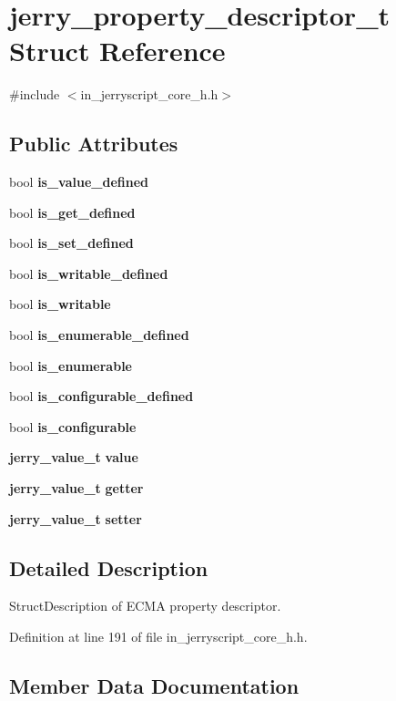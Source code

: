 \section{jerry\+\_\+property\+\_\+descriptor\+\_\+t Struct Reference}
\label{structjerry__property__descriptor__t}


{\ttfamily \#include $<$in\+\_\+jerryscript\+\_\+core\+\_\+h.\+h$>$}

\subsection*{Public Attributes}
\begin{DoxyCompactItemize}
\item 
bool \textbf{ is\+\_\+value\+\_\+defined}
\item 
bool \textbf{ is\+\_\+get\+\_\+defined}
\item 
bool \textbf{ is\+\_\+set\+\_\+defined}
\item 
bool \textbf{ is\+\_\+writable\+\_\+defined}
\item 
bool \textbf{ is\+\_\+writable}
\item 
bool \textbf{ is\+\_\+enumerable\+\_\+defined}
\item 
bool \textbf{ is\+\_\+enumerable}
\item 
bool \textbf{ is\+\_\+configurable\+\_\+defined}
\item 
bool \textbf{ is\+\_\+configurable}
\item 
\textbf{ jerry\+\_\+value\+\_\+t} \textbf{ value}
\item 
\textbf{ jerry\+\_\+value\+\_\+t} \textbf{ getter}
\item 
\textbf{ jerry\+\_\+value\+\_\+t} \textbf{ setter}
\end{DoxyCompactItemize}


\subsection{Detailed Description}
Struct\+Description of E\+C\+MA property descriptor. 

Definition at line 191 of file in\+\_\+jerryscript\+\_\+core\+\_\+h.\+h.



\subsection{Member Data Documentation}
\mbox{\label{structjerry__property__descriptor__t_a4c0aadcef3c8791566857e260b8405cd}} 
